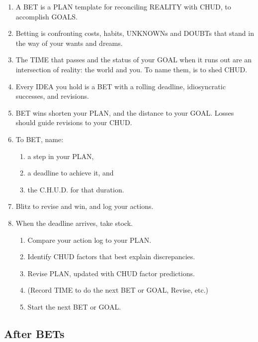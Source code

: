 \documentclass[
]{book}
\providecommand{\tightlist}{%
  \setlength{\itemsep}{0pt}\setlength{\parskip}{0pt}}
\begin{document}
\begin{enumerate}
\def\labelenumi{\arabic{enumi}.}
\setcounter{enumi}{22}
\tightlist
\item
  A BET is a PLAN template for reconciling REALITY with CHUD, to
  accomplish GOALS.
\item
  Betting is confronting costs, habits, UNKNOWNs and DOUBTs that
  stand in the way of your wants and dreams.
\item
  The TIME that passes and the status of your GOAL when it runs out are
  an intersection of reality: the world and you. To name them, is to shed
  CHUD.
\item
  Every IDEA you hold is a BET with a rolling deadline, idiosyncratic
  successes, and revisions.
\item
  BET wins shorten your PLAN, and the distance to your GOAL.
  Losses should guide revisions to your CHUD.
\item
  To BET, name:

  \begin{enumerate}
  \def\labelenumii{\arabic{enumii}.}
  \tightlist
  \item
    a step in your PLAN,
  \item
    a deadline to achieve it, and
  \item
    the C.H.U.D. for that duration.
  \end{enumerate}
\item
  Blitz to revise and win, and log your actions.
\item
  When the deadline arrives, take stock.

  \begin{enumerate}
  \def\labelenumii{\arabic{enumii}.}
  \tightlist
  \item
    Compare your action log to your PLAN.
  \item
    Identify CHUD factors that best explain discrepancies.
  \item
    Revise PLAN, updated with CHUD factor predictions.
  \item
    (Record TIME to do the next BET or GOAL, Revise, etc.)
  \item
    Start the next BET or GOAL.
  \end{enumerate}
\end{enumerate}

\hypertarget{after-bets}{%
\subsection{After BETs}\label{after-bets}}
\end{document}
